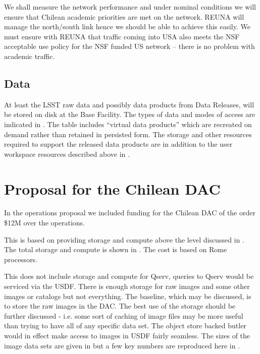 We shall measure the network performance and under nominal conditions we will ensure that Chilean academic priorities are met on the network.
REUNA will manage the north/south link hence we should be able to achieve this easily.
We must ensure with REUNA that traffic coming into USA also meets the NSF acceptable use policy for the NSF funded US network -- there is no problem with academic traffic.


\subsection{Data}
\label{sec:data}

At least the LSST raw data and possibly data products from Data Releases, will be stored on disk at the Base Facility.
The types of data and modes of access are indicated in .
The table includes ``virtual data products'' which are recreated on demand rather than retained in persisted form.
The storage and other resources required to support the released data products are in addition to the user workspace resources described above in .




\section{Proposal for the Chilean DAC}\label{sec:prop}

In the operations proposal  we included funding for the Chilean DAC of the order \$12M over the operations.

This is based on providing storage and compute above the level discussed in .
The total storage and compute is shown in . The cost is based on Rome processors.


This does not include storage and compute for Qserv, queries to Qserv would be serviced via the USDF.
There is enough storage for raw images and some other images or catalogs but not everything.
The baseline, which may be discussed, is to store the raw images in the DAC.
The best use of the storage should be further discussed - i.e. some sort of caching of image files may be more useful than trying to have all of any specific data set.
The object store backed butler would in effect make access to images in USDF fairly seamless.
The sizes of the image data sets are given in  but a few key numbers are reproduced here in .


